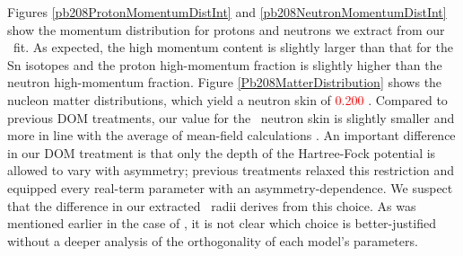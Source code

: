 Figures \ref{pb208ProtonMomentumDistInt} and \ref{pb208NeutronMomentumDistInt} show the momentum 
distribution for protons and neutrons we extract from
our \pbEight\ fit. As expected, the high momentum content is slightly larger than that for the Sn
isotopes and the proton high-momentum fraction is slightly higher than the neutron high-momentum
fraction. Figure \ref{Pb208MatterDistribution} shows the nucleon matter distributions, which yield a
neutron skin of \textcolor{red}{0.200} \femto\meter. Compared to
previous DOM treatments, our value for the
\pbEight\ neutron skin is slightly smaller and more in line with the average of mean-field
calculations \cite{Fattoyev2012}. An important difference in our DOM treatment is that only the
depth of the Hartree-Fock potential is allowed to vary with asymmetry; previous treatments
relaxed this restriction and equipped every real-term parameter with an asymmetry-dependence. We
suspect that the difference in our extracted \pbEight\ radii derives from this choice. As was
mentioned earlier in the case of \caEight, it is not clear which choice is better-justified without
a deeper analysis of the orthogonality of each model's parameters.

